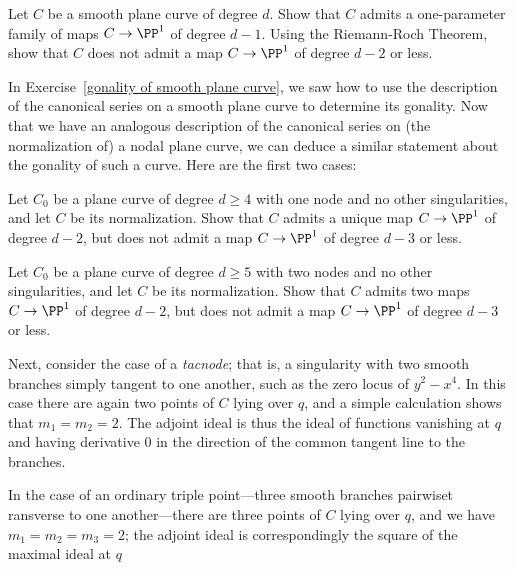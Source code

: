\begin{exercise}\label{gonality of smooth plane curve}
Let $C$ be a smooth plane curve of degree $d$. Show that $C$ admits a one-parameter family of maps $C \to \PP^1$ of degree $d-1$. Using the Riemann-Roch Theorem, show that $C$ does not admit a map $C \to \PP^1$ of degree $d-2$ or less.
\end{exercise}

In Exercise~\ref{gonality of smooth plane curve}, we saw how to use the description of the canonical series on a smooth plane curve to determine its gonality. Now that we have an analogous description of the canonical series on (the normalization of) a nodal plane curve, we can deduce a similar statement about the gonality of such a curve. Here are the first two cases: 

\begin{exercise}
Let $C_0$ be a plane curve of degree $d\geq 4$ with one node and no other singularities, and let $C$ be its normalization. Show that $C$ admits a unique map $C \to \PP^1$ of degree $d-2$, but does not admit a map $C \to \PP^1$ of degree $d-3$ or less.
\end{exercise}

\begin{exercise}
Let $C_0$ be a plane curve of degree $d\geq 5$ with two nodes and no other singularities, and let $C$ be its normalization. Show that $C$ admits two maps $C \to \PP^1$ of degree $d-2$, but does not admit a map $C \to \PP^1$ of degree $d-3$ or less.
\end{exercise}



\begin{example}[tacnodes]
Next, consider the case of a \emph{tacnode}; that is, a singularity with two smooth branches simply tangent to one another, such as the zero locus of $y^2-x^4$. In this case there are again two points of $C$ lying over $q$, and a simple calculation shows that $m_1=m_2=2$. The adjoint ideal is thus the ideal of functions vanishing at $q$ and having derivative 0 in the direction of the common tangent line to the branches.
\end{example}

\begin{exercise}
In the case of an ordinary triple point---three smooth branches pairwiset ransverse to one another---there are three points of $C$ lying over $q$, and we have $m_1=m_2=m_3= 2$; the adjoint ideal is correspondingly 
 the square of the maximal ideal at $q$
\end{exercise}

